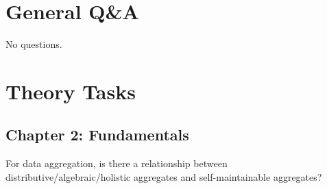 \documentclass[12pt]{article}
\begin{document}
\section*{General Q\&A}

No questions.

\section*{Theory Tasks}

\subsection*{Chapter 2: Fundamentals}

\begin{question}
	For data aggregation, is there a relationship between distributive/algebraic/holistic aggregates and self-maintainable aggregates?
\end{question}
\end{document}
